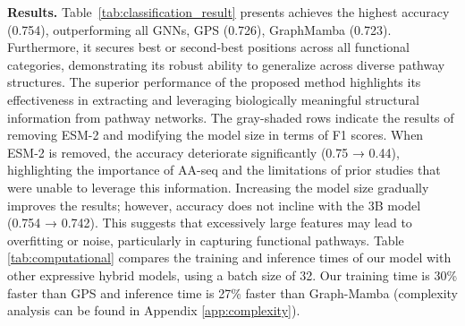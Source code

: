 

\noindent\textbf{Results.}
Table~\ref{tab:classification_result} presents \classifier achieves the highest accuracy (0.754), outperforming all GNNs, GPS (0.726), GraphMamba (0.723). Furthermore, it secures best or second-best positions across all functional categories, demonstrating its robust ability to generalize across diverse pathway structures.
The superior performance of the proposed method highlights its effectiveness in extracting and leveraging biologically meaningful structural information from pathway networks.
The gray-shaded rows indicate the results of removing ESM-2 and modifying the model size in terms of F1 scores.
When ESM-2 is removed, the accuracy deteriorate significantly (0.75 → 0.44), highlighting the importance of AA-seq and the limitations of prior studies that were unable to leverage this information. 
Increasing the model size gradually improves the results; however, accuracy does not incline with the 3B model (0.754 → 0.742). This suggests that excessively large features may lead to overfitting or noise, particularly in capturing functional pathways.
Table \ref{tab:computational} compares the training and inference times of our model with other expressive hybrid models, using a batch size of 32. Our training time is 30\% faster than GPS and inference time is 27\% faster than Graph-Mamba (complexity analysis can be found in Appendix \ref{app:complexity}).

\begin{table}[t]
\centering
\caption{The computational efficiency comparison with hybrid models, including both training and inference runtime. }
\vspace{-0.3cm}
\end{table}




